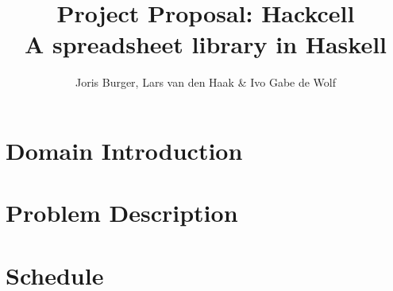 \documentclass{article}
\title{
	\vskip -3cm
	Project Proposal: Hackcell \\
	\vskip 0.5cm
	\large{A spreadsheet library in Haskell}
}
\author{Joris Burger, Lars van den Haak \& Ivo Gabe de Wolf}
\begin{document}
	\maketitle
	\section{Domain Introduction}
	
	\section{Problem Description}
	
	\section{Schedule}
\end{document}
